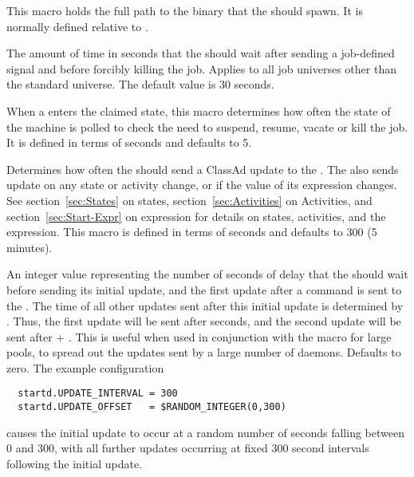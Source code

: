 \begin{description}

\label{param:Starter}
\item[\Macro{STARTER}]
  This macro holds the
  full path to the  binary that the  should 
  spawn.
  It is normally defined relative to .
  
\label{param:KillingTimeout}
\item[\Macro{KILLING\_TIMEOUT}]
  The amount of time in seconds that the  should wait after 
  sending a job-defined signal and before forcibly killing the job.  
  Applies to all job universes other than the standard universe.
  The default value is 30 seconds. 

\label{param:PollingInterval}
\item[\Macro{POLLING\_INTERVAL}]
  When a
   enters the claimed state, this macro determines how often
  the state of the machine is polled to check the need to suspend, resume,
  vacate or kill the job.  It is defined in terms of seconds and defaults to
  5.
  
\label{param:UpdateInterval}
\item[\Macro{UPDATE\_INTERVAL}]
  Determines how often the  should send a ClassAd update
  to the .  The  also sends update on any
  state or activity change, or if the value of its  expression
  changes.  See section~\ref{sec:States} on 
  states, section~\ref{sec:Activities} on 
  Activities, and section~\ref{sec:Start-Expr} on 
   expression for details on states, activities, and the
   expression.  This macro is defined in
  terms of seconds and defaults to 300 (5 minutes).
  
\label{param:UpdateOffset}
\item[\Macro{UPDATE\_OFFSET}]
  An integer value representing the number of seconds of delay 
  that the  should wait
  before sending its initial update, and the first update after a
   command is sent to the .
  The time of all other updates sent after this initial update
  is determined by .
  Thus, the first update will be sent after
   seconds, and the second update will be sent after
   + .
  This is useful when used in conjunction
  with the  macro for large pools,
  to spread out the updates
  sent by a large number of  daemons.
  Defaults to zero.
  The example configuration
  \footnotesize
  \begin{verbatim}
  startd.UPDATE_INTERVAL = 300
  startd.UPDATE_OFFSET   = $RANDOM_INTEGER(0,300)
  \end{verbatim}
  \normalsize
  causes the initial update to occur at a random number of seconds
  falling between 0 and 300,
  with all further updates occurring at fixed 300
  second intervals following the initial update.


\end{description}
